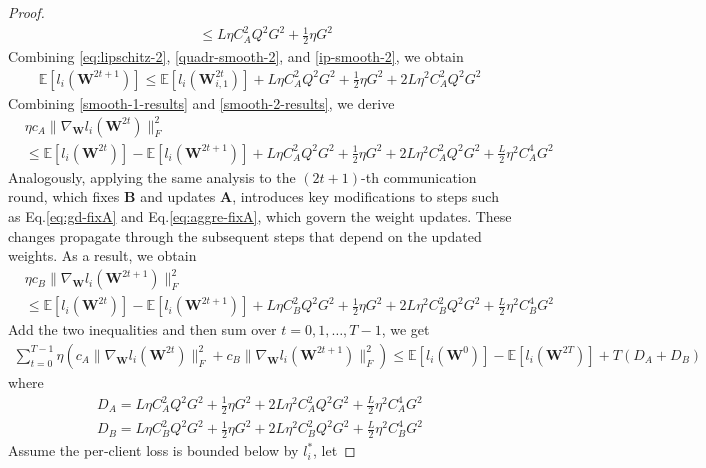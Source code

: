 \begin{proof}
\begin{align}
    & \le L \eta C_A^2 Q^2 G^2 + \frac{1}{2} \eta G^2 \label{ip-smooth-2}
\end{align}
Combining \eqref{eq:lipschitz-2}, \eqref{quadr-smooth-2}, and \eqref{ip-smooth-2}, we obtain
\begin{align}
    \mathbb{E}[l_i(\mathbf{W}^{2t+1})] \leq \mathbb{E}[l_i(\mathbf{W}^{2t}_{i,1})] + L \eta C_A^2 Q^2 G^2 + \frac{1}{2} \eta G^2  + 2L \eta^2 C_A^2 Q^2 G^2 \label{smooth-2-results}
\end{align}
Combining \eqref{smooth-1-results} and \eqref{smooth-2-results}, we derive
\begin{align}
   & \eta c_A \| \nabla_{\mathbf{W}}l_i (\mathbf{W}^{2t})\|_F^2 \nonumber\\ 
   &  \le \mathbb{E}[l_i(\mathbf{W}^{2t})]-\mathbb{E}[l_i(\mathbf{W}^{2t+1})] + L \eta C_A^2 Q^2 G^2 + \frac{1}{2} \eta G^2 + 2L \eta^2 C_A^2 Q^2 G^2 + \frac{L}{2} \eta^2 C_A^4 G^2
\end{align}
Analogously, applying the same analysis to the $(2t+1)$-th communication round, which fixes $\mathbf{B}$ and updates $\mathbf{A}$, introduces key modifications to steps such as Eq.\eqref{eq:gd-fixA} and Eq.\eqref{eq:aggre-fixA}, which govern the weight updates. These changes propagate through the subsequent steps that depend on the updated weights. As a result, we obtain
\begin{align}
     & \eta c_B \| \nabla_{\mathbf{W}}l_i (\mathbf{W}^{2t+1})\|_F^2 \nonumber\\ 
   &  \le \mathbb{E}[l_i(\mathbf{W}^{2t})]-\mathbb{E}[l_i(\mathbf{W}^{2t+1})] + L \eta C_B^2 Q^2 G^2 + \frac{1}{2} \eta G^2 + 2L \eta^2 C_B^2 Q^2 G^2 + \frac{L}{2} \eta^2 C_B^4 G^2
\end{align}
Add the two inequalities and then sum over $t=0,1,\dots, T-1$, we get
\begin{align}
    \sum_{t=0}^{T-1} \eta (c_A \| \nabla_{\mathbf{W}}l_i (\mathbf{W}^{2t})\|_F^2 + c_B \| \nabla_{\mathbf{W}}l_i (\mathbf{W}^{2t+1})\|_F^2  ) \leq \mathbb{E}[l_i(\mathbf{W}^{0})]-\mathbb{E}[l_i(\mathbf{W}^{2T})] +T (D_A+D_B)
\end{align}
where
\begin{align}
    D_A = L \eta C_A^2 Q^2 G^2 + \frac{1}{2} \eta G^2 + 2L \eta^2 C_A^2 Q^2 G^2 + \frac{L}{2} \eta^2 C_A^4 G^2 \\
    D_B = L \eta C_B^2 Q^2 G^2 + \frac{1}{2} \eta G^2 + 2L \eta^2 C_B^2 Q^2 G^2 + \frac{L}{2} \eta^2 C_B^4 G^2
\end{align}
Assume the per‑client loss is bounded below by $l_i^*$, let 

\end{proof}
